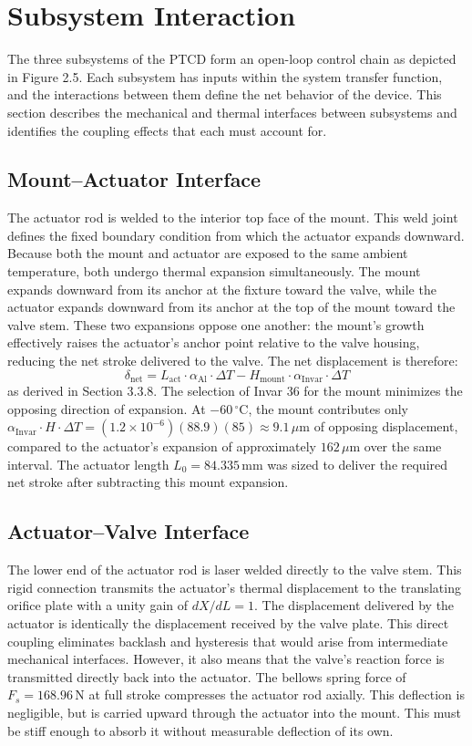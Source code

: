 \documentclass[12pt, letterpaper]{report}%
\newcounter{mycounter}           %
\newcounter{sub}[mycounter]      %
\begin{document}
    

    \section{Subsystem Interaction}
    
   
    The three subsystems of the PTCD form an open-loop control chain as depicted in Figure 2.5. Each subsystem has inputs within the system transfer function, and the interactions between them define the net behavior of the device. This section describes the mechanical and thermal interfaces between subsystems and identifies the coupling effects that each must account for.
    
    \subsection{Mount–Actuator Interface}
    The actuator rod is welded to the interior top face of the mount. This weld joint defines the fixed boundary condition from which the actuator expands downward. Because both the mount and actuator are exposed to the same ambient temperature, both undergo thermal expansion simultaneously. The mount expands downward from its anchor at the fixture toward the valve, while the actuator expands downward from its anchor at the top of the mount toward the valve stem. 
    These two expansions oppose one another: the mount's growth effectively raises the actuator's anchor point relative to the valve housing, reducing the net stroke delivered to the valve. The net displacement is therefore:
    $$ \delta_{\text{net}} = L_{\text{act}} \cdot \alpha_{\text{Al}} \cdot \Delta T - H_{\text{mount}} \cdot \alpha_{\text{Invar}} \cdot \Delta T $$ as derived in Section 3.3.8. The selection of Invar 36 for the mount minimizes the opposing direction of expansion. At $-60\,^\circ\text{C}$, the mount contributes only $\alpha_{\text{Invar}} \cdot H \cdot \Delta T = (1.2 \times 10^{-6})(88.9)(85) \approx 9.1\,\mu\text{m}$ of opposing displacement, 
    compared to the actuator's expansion of approximately $162\,\mu\text{m}$ over the same interval. The actuator length $L_0 = 84.335\,\text{mm}$ was sized to deliver the required net stroke after subtracting this mount expansion.

    \subsection{Actuator–Valve Interface}
    The lower end of the actuator rod is laser welded directly to the valve stem. This rigid connection transmits the actuator's thermal displacement to the translating orifice plate with a unity gain of $dX/dL = 1$. The displacement delivered by the actuator is identically the displacement received by the valve plate. This direct coupling eliminates backlash and hysteresis that would arise from 
    intermediate mechanical interfaces. However, it also means that the valve's reaction force is transmitted directly back into the actuator. The bellows spring force of $F_s = 168.96\,\text{N}$ at full stroke compresses the 
    actuator rod axially. This deflection is negligible, but is carried upward through the actuator into the mount. This must be stiff enough to absorb it without measurable deflection of its own.
\end{document}
